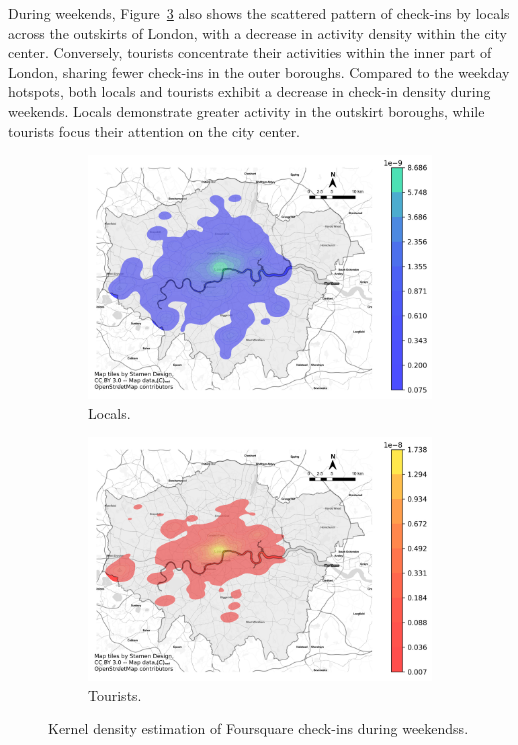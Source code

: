 \documentclass{article}
\begin{document}
During weekends, Figure~\ref{fig:kde_weekend} also shows the scattered pattern of check-ins by locals across the outskirts of London, with a decrease in activity density within the city center. Conversely, tourists concentrate their activities within the inner part of London, sharing fewer check-ins in the outer boroughs. Compared to the weekday hotspots, both locals and tourists exhibit a decrease in check-in density during weekends. Locals demonstrate greater activity in the outskirt boroughs, while tourists focus their attention on the city center.

\begin{figure}[!h]

\begin{subfigure}{0.5\textwidth}
\includegraphics[width=1\linewidth]{figures/kde_locals_weekend.png} 
\caption{Locals.}
\label{fig:kde_locals_weekend}
\end{subfigure}
\begin{subfigure}{0.5\textwidth}
\includegraphics[width=1\linewidth]{figures/kde_tourists_weekend.png}
\caption{Tourists.}
\label{fig:kde_tourists_weekend}
\end{subfigure}

\caption{Kernel density estimation of Foursquare check-ins during weekendss.} \label{fig:kde_weekend}
\end{figure}
\end{document}

